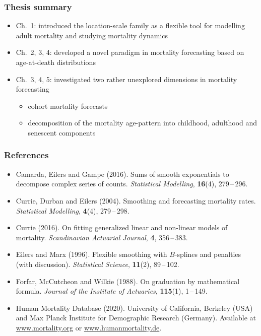 \documentclass[12pt, xcolor=table]{beamer}  %
\begin{document}
\begin{frame}[label=summary]\frametitle{Thesis summary}
	\begin{itemize}
		\setlength\itemsep{1.2em}
		\item[] {Ch.~1}: introduced the location-scale family as a flexible tool for modelling adult mortality and studying mortality dynamics \pause
		\item[] {Ch.~2, 3, 4}: developed a novel paradigm in mortality forecasting based on age-at-death distributions 
		\pause
		\item[] {Ch.~3, 4, 5}: investigated two rather unexplored dimensions in mortality forecasting
		\begin{itemize}
		\item cohort mortality forecasts
		\item decomposition of the mortality age-pattern into childhood, adulthood and senescent components
		\end{itemize}
	\end{itemize}
\end{frame}

\begin{frame}[noframenumbering]\frametitle{References}
	\scriptsize

\begin{itemize}
\setlength\itemsep{1.2em}	
	
	\item[] Camarda, Eilers and Gampe (2016). Sums of smooth exponentials to decompose complex series of counts. {\it Statistical Modelling}, {\bf 16}(4), 279\,--\,296.
	
	\item[] Currie, Durban and Eilers (2004). Smoothing and forecasting mortality rates. {\it Statistical Modelling}, {\bf 4}(4), 279\,--\,298.
	
	\item[] Currie (2016). On fitting generalized linear and non-linear models of mortality. {\it Scandinavian Actuarial Journal}, {\bf 4}, 356\,--\,383.
	
	\item[] Eilers and Marx (1996). Flexible smoothing with $B$-splines and penalties (with discussion). {\it Statistical Science}, {\bf 11}(2), 89\,--\,102.
	
	\item[] Forfar, McCutcheon and Wilkie (1988). On graduation by mathematical formula. {\it Journal of the Institute of Actuaries}, {\bf 115}(1), 1\,--\,149.
	
	\item[] Human Mortality Database (2020). University of California, Berkeley (USA) and Max Planck Institute for Demographic Research (Germany). Available at \url{www.mortality.org} or \url{www.humanmortality.de}.

\end{itemize}

\end{frame}
\end{document}
